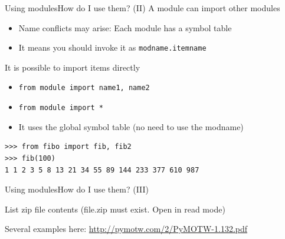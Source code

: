 \documentclass[10pt,compress]{beamer} %
\begin{document}
\begin{frame}[fragile]{Using modules}{How do I use them?  (II)}
	A module can import other modules
		\begin{itemize}
		\item Name conflicts may arise: Each module has a symbol table
		\item It means you should invoke it as \texttt{modname.itemname}
		\end{itemize}
 	It is possible to import items directly
		\begin{itemize}
		\item \texttt{from module import name1, name2}
		\item \texttt{from module import *}
		\item It uses the global symbol table (no need to use the modname)
			\end{itemize}
	
	\begin{exampleblock}{}
	\begin{verbatim}
>>> from fibo import fib, fib2
>>> fib(100)
1 1 2 3 5 8 13 21 34 55 89 144 233 377 610 987
\end{verbatim}
	\end{exampleblock}
\end{frame}

\begin{frame}[fragile]{Using modules}{How do I use them?  (III)}
	\vspace{-0.2cm}
	\begin{block}{List zip file contents (file.zip must exist. Open in read mode)}
	\vspace{-0.2cm}
	
	\vspace{-0.2cm}
	\end{block}
	
	\vspace{-0.2cm}
	\centering \footnotesize{Several examples here: \url{http://pymotw.com/2/PyMOTW-1.132.pdf}}
\end{frame}
\end{document}
